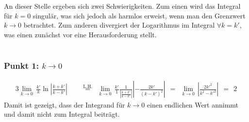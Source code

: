 \begin{comment}
%
%
\text{also}\qquad 		&& c \int  \Psi(k ')\frac{1}{|\Vk - \Vk '|^2} d^3 k' 	&= c\int\limits_{0}^{\infty}\int\limits_{0}^{\pi}\int\limits_{0}^{2\pi} \Psi(k ')\frac{k '^2 \sin(\vartheta)}{k ^2 + k '^2 -2kk '\cos(\vartheta)} \,d\varphi \, d\vartheta \, dk' \\
									&& &= 2\pi c\int\limits_{0}^{\infty}\int\limits_{-1}^{1} \Psi(k ')\frac{k '^2}{k ^2 + k '^2 -2kk 'u} \,du \, dk' \\
									&& &= -2\pi c\int\limits_{0}^{\infty} \Psi(k ')\frac{k '^2}{2kk '}\ln{(k ^2 + k '^2 -2kk 'u)}\Big |_{\text{-}1}^1 \,dk' \\
									&& &= \underbrace{2\pi \,c}_{-\dfrac{e^2}{4\pi^2 \epsilon_0}} \int\limits_{0}^{\infty} \Psi(k ')\frac{k '}{k}\ln{\left |\frac{k + k '}{k-k'}\right |} \, dk' \\
\end{comment}

An dieser Stelle ergeben sich zwei Schwierigkeiten. Zum einen wird das Integral für $k = 0$ singulär, was sich jedoch als harmlos erweist, wenn man den Grenzwert $k \rightarrow 0$ betrachtet. Zum anderen divergiert der Logarithmus im Integral $\forall k=k'$, was einen zunächst vor eine Herausforderung stellt. \\ \\
\subsubsection{Punkt 1: $k\rightarrow0$}
\begin{alignat*}{3}
\lim_{k\rightarrow 0}\,\frac{k '}{k}\ln{\left |\frac{k + k '}{k-k'}\right |} \ \  &&  \stackrel{\text{L.H.}}{=} \ \ \lim_{k\rightarrow 0}\,\frac{k '}{1}\frac{1}{\left |\frac{k + k '}{k-k'}\right |}\left |-\frac{2k'}{(k-k')^2}\right | \ \ = \ \  \lim_{k\rightarrow 0}\,\left |\frac{2k '^2}{{k^2 - k '^2}}\right | \ \ = \ \ 2 
\end{alignat*}
Damit ist gezeigt, dass der Integrand für $k \rightarrow 0$ einen endlichen Wert annimmt und damit nicht zum Integral beiträgt. 
